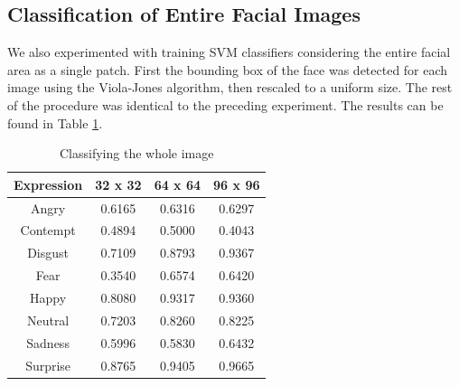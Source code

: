 \subsection{Classification of Entire Facial Images}\label{sec:experiments:face}
We also experimented with training SVM classifiers considering the entire facial area as a single patch. First the bounding box of the face was detected
for each image using the Viola-Jones algorithm, then rescaled to a uniform size. %
The rest of the procedure was identical to the preceding experiment. The results can be found in Table \ref{table:entire_images}.

\begin{table}
\begin{tabular}{| c | c | c | c |}
\hline
Expression & 32 x 32 &  64 x 64  & 96 x 96  \\

\hline
Angry	 & 0.6165 & 0.6316 & 0.6297	\\
Contempt & 0.4894 & 0.5000 & 0.4043	\\
Disgust	 & 0.7109 & 0.8793 & 0.9367	\\
Fear	 & 0.3540 & 0.6574 & 0.6420	\\
Happy	 & 0.8080 & 0.9317 & 0.9360	\\
Neutral	 & 0.7203 & 0.8260 & 0.8225	\\
Sadness	 & 0.5996 & 0.5830 & 0.6432	\\
Surprise & 0.8765 & 0.9405 & 0.9665	\\

\hline
\end{tabular}
\caption{Classifying the whole image}
\label{table:entire_images}
\end{table}



